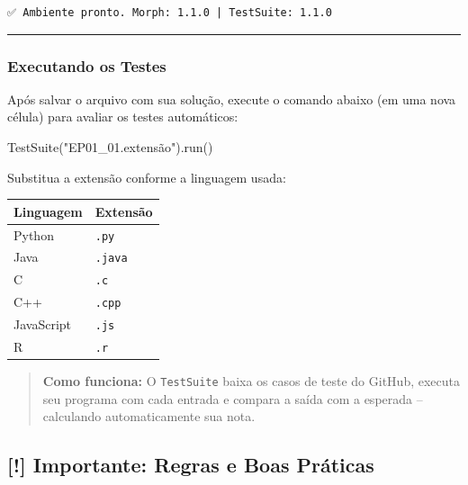 \documentclass[
  portuguese,
  letterpaper,
  openany,
  oneside,
  12pt,
  a4paper]{book}
\newenvironment{Shaded}{\begin{snugshade}}{\end{snugshade}}
\newcommand{\NormalTok}[1]{\textcolor[rgb]{0.00,0.23,0.31}{#1}}
\newcommand{\StringTok}[1]{\textcolor[rgb]{0.13,0.47,0.30}{#1}}
\begin{document}
\begin{verbatim}
✅ Ambiente pronto. Morph: 1.1.0 | TestSuite: 1.1.0
\end{verbatim}

\begin{center}\rule{0.5\linewidth}{0.5pt}\end{center}

\subsubsection*{Executando os Testes}\label{executando-os-testes}

Após salvar o arquivo com sua solução, execute o comando abaixo (em uma
nova célula) para avaliar os testes automáticos:

\begin{Shaded}
\begin{Highlighting}[]
\NormalTok{TestSuite(}\StringTok{"EP01\_01.extensão"}\NormalTok{).run()}
\end{Highlighting}
\end{Shaded}

Substitua a extensão conforme a linguagem usada:

\begin{longtable}[]{@{}ll@{}}
\toprule\noalign{}
Linguagem & Extensão \\
\midrule\noalign{}
\endhead
\bottomrule\noalign{}
\endlastfoot
Python & \texttt{.py} \\
Java & \texttt{.java} \\
C & \texttt{.c} \\
C++ & \texttt{.cpp} \\
JavaScript & \texttt{.js} \\
R & \texttt{.r} \\
\end{longtable}

\begin{quote}
\textbf{Como funciona:} O \texttt{TestSuite} baixa os casos de teste do
GitHub, executa seu programa com cada entrada e compara a saída com a
esperada -- calculando automaticamente sua nota.
\end{quote}

\subsection*{\texorpdfstring{\textbf{[!]} Importante: Regras e Boas
Práticas}{ Importante: Regras e Boas Práticas}}\label{importante-regras-e-boas-pruxe1ticas}
\end{document}
